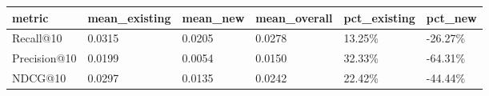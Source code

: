 \begin{tabular}{llllll}
\toprule
metric & mean_existing & mean_new & mean_overall & pct_existing & pct_new \\
\midrule
Recall@10 & 0.0315 & 0.0205 & 0.0278 & 13.25\% & -26.27\% \\
Precision@10 & 0.0199 & 0.0054 & 0.0150 & 32.33\% & -64.31\% \\
NDCG@10 & 0.0297 & 0.0135 & 0.0242 & 22.42\% & -44.44\% \\
\bottomrule
\end{tabular}

